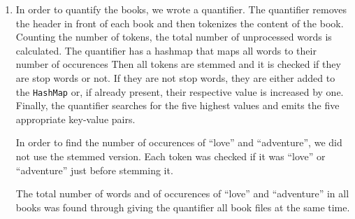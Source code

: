 \documentclass[a4paper,11pt,oneside]{book}
\begin{document}
\begin{enumerate}
	\item In order to quantify the books, we wrote a quantifier. The quantifier removes the header in front of each book and then tokenizes the content of the book. Counting the number of tokens, the total number of unprocessed words is calculated.
The quantifier has a hashmap that maps all words to their number of occurences
Then all tokens are stemmed and it is checked if they are stop words or not. If they are not stop words, they are either added to the \texttt{HashMap} or, if already present, their respective value is increased by one.
Finally, the quantifier searches for the five highest values and emits the five appropriate key-value pairs.

In order to find the number of occurences of ``love'' and ``adventure'', we did not use the stemmed version. Each token was checked if it was ``love'' or ``adventure'' just before stemming it.

The total number of words and of occurences of ``love'' and ``adventure'' in all books was found through giving the quantifier all book files at the same time.


\end{enumerate}
\end{document}
